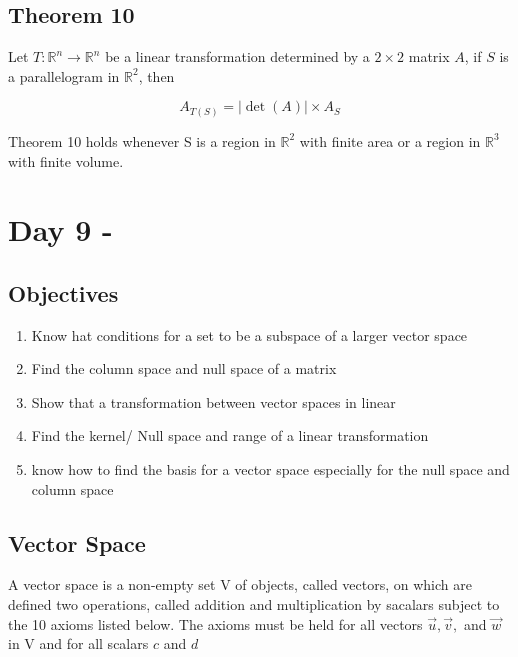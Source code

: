 \subsection{Theorem 10}
Let $T:\mathbb{R}^{n}\to\mathbb{R}^{n}$ be a linear transformation determined by a $2 \times 2$ matrix $A$, if $S$ is a parallelogram in $\mathbb{R}^{2}$, then

\begin{equation}
	\label{Theorem10}
	A_{T(S)}= |\det(A)|\times A_{S}	
\end{equation}

Theorem 10 holds whenever S is a region in $\mathbb{R}^{2}$ with finite area or a region in $\mathbb{R}^{3}$ with finite volume.


\section{Day 9 - }
\subsection{Objectives}

\begin{enumerate}
	\item Know hat conditions for a set to be a subspace of a larger vector space
	\item Find the column space and null space of a matrix
	\item Show that a transformation between vector spaces in linear
	\item Find the kernel/ Null space and range of a linear transformation
	\item know how to find the basis for a vector space especially for the null space and column space
\end{enumerate}

\subsection{Vector Space}

A vector space is a non-empty set V of objects, called vectors, on which are defined two operations, called addition and multiplication by sacalars subject to the 10 axioms listed below. The axioms must be held for all vectors $\vec{u},\vec{v},$ and $ \vec{w} $  in V and for all scalars $ c $  and $ d $ 


